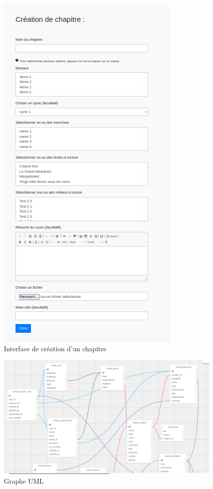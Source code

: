 \documentclass[12pt]{article}
\begin{document}
\begin{figure}
    \centering
    \includegraphics[scale=0.9]{crea_chap.png}
    \caption{Interface de création d'un chapitre}
    \label{fig:crea_chap}
\end{figure}

\begin{figure}
    \centering
    \includegraphics[scale=0.3]{uml1.png}
    \caption{Graphe UML}
    \label{fig:UML1}
\end{figure}
\end{document}
